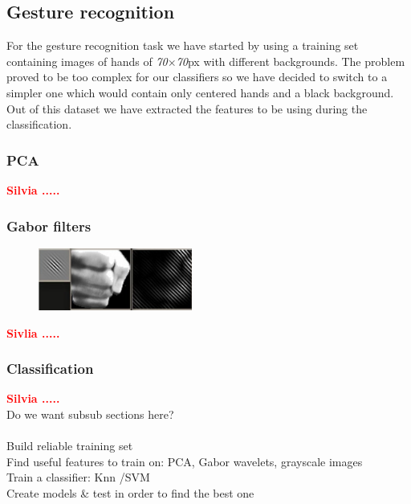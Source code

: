 \documentclass[a4paper, 11pt, twocolumn]{article}
\newcommand{\todo}[1]{\textcolor{red}{\textbf{#1}}}
\begin{document}
        \subsection{Gesture recognition}
		For the gesture recognition task we have started by using a training set containing images of hands of \emph{70$\times$70}px with different backgrounds. The problem proved to be too complex for our classifiers so we have decided to switch to a simpler one which would contain only centered hands and a black background.\\ 
		\hspace*{10px}Out of this dataset we have extracted the features to be using during the classification.
		\label{sec:Meth_clssifyHands}
		\subsubsection{PCA}
		\todo{Silvia .....}\\

		\subsubsection{Gabor filters}
		\begin{flushleft}
		\begin{figure}[!hbtp]
		   \centering
		   \includegraphics[width=0.45\textwidth]{gabor.jpg}
	   	\end{figure}	
		\end{flushleft}

		\todo{Sivlia .....}\\

		\subsubsection{Classification}
		\todo{Silvia .....}\\


        Do we want subsub sections here?\\\\
        Build reliable training set\\
        Find useful features to train on: PCA, Gabor wavelets, grayscale images\\
        Train a classifier: Knn /SVM\\
        Create models \& test in order to find the best one\\
        
\end{document}
